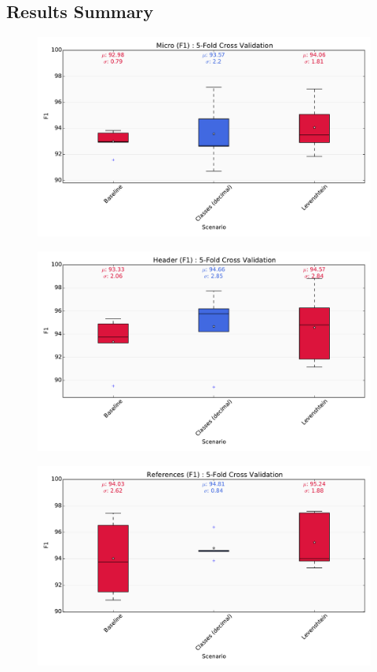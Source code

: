 \subsection{Results Summary}

\begin{figure}[h]
\center
\includegraphics[width=5.5in]{Figures/micro.pdf}
\caption{}
\label{fig:micro}
\end{figure}

\begin{figure}[h]
\center
\includegraphics[width=5.5in]{Figures/header.pdf}
\caption{}
\label{fig:header}
\end{figure}

\begin{figure}[h]
\center
\includegraphics[width=5.5in]{Figures/references.pdf}
\caption{}
\label{fig:references}
\end{figure}
